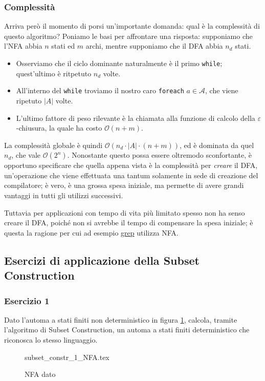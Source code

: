 \documentclass[class=book, crop=false, oneside, 12pt]{standalone}
\begin{document}
\subsubsection{Complessità}
Arriva però il momento di porsi un'importante domanda: qual è la complessità di questo algoritmo?
Poniamo le basi per affrontare una risposta: supponiamo che l’NFA abbia \(n\) stati ed \(m\) archi, mentre supponiamo che il DFA abbia \(n_d\) stati.
\begin{itemize}
    \item Osserviamo che il ciclo dominante naturalmente è il primo \texttt{while}; quest'ultimo  è ritpetuto \(n_d\) volte.
    \item All'interno del \texttt{while} troviamo il nostro caro \texttt{foreach} \(a \in \mathcal{A}\), che viene ripetuto \(|A|\) volte.
    \item L'ultimo fattore di peso rilevante è la chiamata alla funzione di calcolo della \(\varepsilon\)-chiusura, la quale ha costo \(\mathcal{O}(n+m)\).
\end{itemize}
La complessità globale è quindi \( \mathcal{O}(n_d \cdot |A| \cdot (n+m))\), ed è dominata da quel \(n_d\), che vale \(\mathcal{O}(2^n)\). Nonostante questo possa essere oltremodo sconfortante, è opportuno specificare che quella appena vista è la complessità per \emph{creare} il DFA, un'operazione che viene effettuata una tantum solamente in sede di creazione del compilatore; è vero, è una grossa spesa iniziale, ma permette di avere grandi vantaggi in tutti gli utilizzi successivi.

Tuttavia per applicazioni con tempo di vita più limitato spesso non ha senso creare il DFA, poiché non si avrebbe il tempo di compensare la spesa iniziale; è questa la ragione per cui ad esempio \href{https://it.wikipedia.org/wiki/Grep}{grep} utilizza NFA.


\subsection{Esercizi di applicazione della Subset Construction}
\subsubsection*{Esercizio 1}
Dato l'automa a stati finiti non deterministico in figura \ref{es_sc_1}, calcola, tramite l'algoritmo di Subset Construction, un automa a stati finiti deterministico che riconosca lo stesso linguaggio.
\begin{figure}[H]
    \centering
    {subset_constr_1_NFA.tex}
    \caption{NFA dato}
    \label{es_sc_1}
\end{figure}
\end{document}
